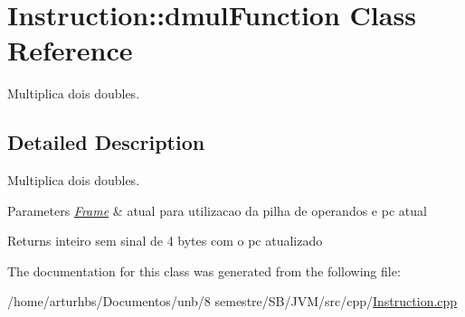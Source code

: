 \hypertarget{classInstruction_1_1dmulFunction}{}\section{Instruction\+:\+:dmul\+Function Class Reference}
\label{classInstruction_1_1dmulFunction}


Multiplica dois doubles.  




\subsection{Detailed Description}
Multiplica dois doubles. 


\begin{DoxyParams}{Parameters}
{\em \hyperlink{classFrame}{Frame}} & atual para utilizacao da pilha de operandos e pc atual \\
\hline
\end{DoxyParams}
\begin{DoxyReturn}{Returns}
inteiro sem sinal de 4 bytes com o pc atualizado 
\end{DoxyReturn}


The documentation for this class was generated from the following file\+:\begin{DoxyCompactItemize}
\item 
/home/arturhbs/\+Documentos/unb/8 semestre/\+S\+B/\+J\+V\+M/src/cpp/\hyperlink{Instruction_8cpp}{Instruction.\+cpp}\end{DoxyCompactItemize}
